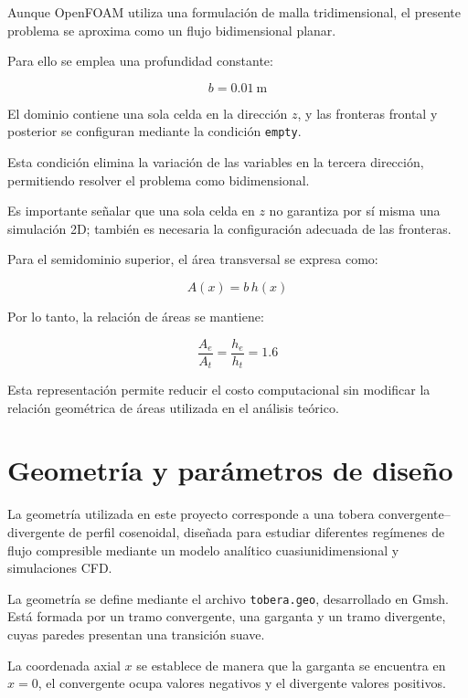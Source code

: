 \documentclass[12pt,letterpaper]{article}
\numberwithin{equation}{section}
\begin{document}
Aunque OpenFOAM utiliza una
formulación de malla tridimensional,
el presente problema se aproxima
como un flujo bidimensional planar.

Para ello se emplea una
profundidad constante:

\begin{equation}
    b=0.01\ \mathrm{m}
\end{equation}

El dominio contiene una sola
celda en la dirección $z$,
y las fronteras frontal y
posterior se configuran
mediante la condición
\texttt{empty}.

Esta condición elimina la
variación de las variables
en la tercera dirección,
permitiendo resolver el
problema como bidimensional.

Es importante señalar que
una sola celda en $z$ no
garantiza por sí misma
una simulación 2D; también
es necesaria la configuración
adecuada de las fronteras.

Para el semidominio superior,
el área transversal se expresa como:

\begin{equation}
    A(x)=b\,h(x)
\end{equation}

Por lo tanto, la relación
de áreas se mantiene:

\begin{equation}
    \frac{A_e}{A_t}
    =\frac{h_e}{h_t}=1.6
\end{equation}

Esta representación permite
reducir el costo computacional
sin modificar la relación
geométrica de áreas utilizada
en el análisis teórico.

\section{Geometría y parámetros de diseño}
\label{sec:geometria_diseno}

La geometría utilizada en este proyecto corresponde
a una tobera convergente--divergente de perfil
cosenoidal, diseñada para estudiar diferentes
regímenes de flujo compresible mediante un modelo
analítico cuasiunidimensional y simulaciones CFD.

La geometría se define mediante el archivo
\texttt{tobera.geo}, desarrollado en Gmsh.
Está formada por un tramo convergente, una
garganta y un tramo divergente, cuyas paredes
presentan una transición suave.

La coordenada axial $x$ se establece de manera
que la garganta se encuentra en $x=0$,
el convergente ocupa valores negativos
y el divergente valores positivos.
\end{document}
